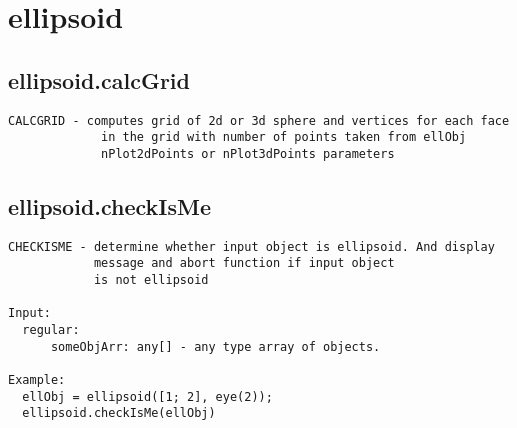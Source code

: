 \section{ellipsoid}\label{secClassDescr:ellipsoid}
\subsection{\texorpdfstring{ellipsoid.calcGrid}{calcGrid}}\label{method:ellipsoid.calcGrid}
\begin{verbatim}
CALCGRID - computes grid of 2d or 3d sphere and vertices for each face
             in the grid with number of points taken from ellObj
             nPlot2dPoints or nPlot3dPoints parameters
\end{verbatim}
\subsection{\texorpdfstring{ellipsoid.checkIsMe}{checkIsMe}}\label{method:ellipsoid.checkIsMe}
\begin{verbatim}
CHECKISME - determine whether input object is ellipsoid. And display
            message and abort function if input object
            is not ellipsoid

Input:
  regular:
      someObjArr: any[] - any type array of objects.

Example:
  ellObj = ellipsoid([1; 2], eye(2));
  ellipsoid.checkIsMe(ellObj)
\end{verbatim}
